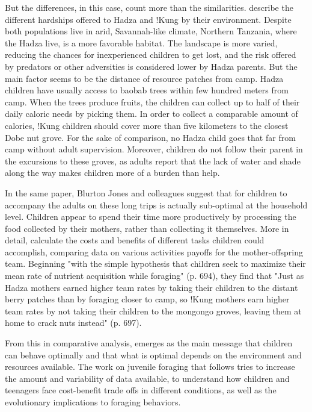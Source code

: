 But the differences, in this case, count more than the similarities.
\cite{blurton_jones_foraging_1994, blurton_jones_differences_1994} describe the different hardships offered to Hadza and !Kung by their environment. Despite both populations live in arid, Savannah-like climate, Northern Tanzania, where the Hadza live, is a more favorable habitat. The landscape is more varied, reducing the chances for inexperienced children to get lost, and the risk offered by predators or other adversities is considered lower by Hadza parents. But the main factor seems to be the distance of resource patches from camp. Hadza children have usually access to baobab trees within few hundred meters from camp. When the trees produce fruits, the children can collect up to half of their daily caloric needs by picking them. In order to collect a comparable amount of calories, !Kung children should cover more than five kilometers to the closest Dobe nut grove. For the sake of comparison, no Hadza child goes that far from camp without adult supervision. Moreover, children do not follow their parent in the excursions to these groves, as adults report that the lack of water and shade along the way makes children more of a burden than help. 

In the same paper, Blurton Jones and colleagues suggest that for children to accompany the adults on these long trips is actually sub-optimal at the household level. Children appear to spend their time more productively by processing the food collected by their mothers, rather than collecting it themselves. More in detail, \cite{hawkes_hadza_1995} calculate the costs and benefits of different tasks children could accomplish, comparing data on various activities payoffs for the mother-offspring team. Beginning "with the simple hypothesis that children seek to maximize their mean rate of nutrient acquisition while foraging" (p. 694), they find that "Just as Hadza mothers earned higher team rates by taking their children to the distant berry patches than by foraging closer to camp, so !Kung mothers earn higher team rates by not taking their children to the mongongo groves, leaving them at home to crack nuts instead" (p. 697).

From this in comparative analysis, emerges as the main message that children can behave optimally and that what is optimal depends on the environment and resources available. The work on juvenile foraging that follows tries to increase the amount and variability of data available, to understand how children and teenagers face cost-benefit trade offs in different conditions, as well as the evolutionary implications to foraging behaviors.

